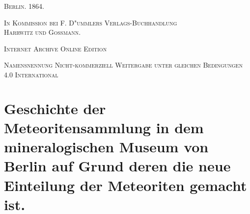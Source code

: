 \documentclass[a4paper, 11pt, oneside, german]{article}
\begin{document}
\begin{titlepage}
	\vspace{1\baselineskip}

	{\small\scshape Berlin. 1864.}
	
	{\small\scshape{In Kommission bei F. D"ummlers Verlags-Buchhandlung\\Harrwitz und Gossmann.}}
	
	\vspace{0.5\baselineskip} %

    \scshape Internet Archive Online Edition  %
	
	{\scshape\small Namensnennung Nicht-kommerziell Weitergabe unter gleichen Bedingungen 4.0 International} %
\end{titlepage}
\setlength{\parskip}{1mm plus1mm minus1mm}
\clearpage
\tableofcontents
\clearpage
\section*{Geschichte der Meteoritensammlung in dem mineralogischen Museum von Berlin auf Grund deren die neue Einteilung der Meteoriten gemacht ist.}
\end{document}
